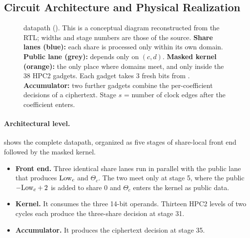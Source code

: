 \subsection{Circuit Architecture and Physical Realization}\label{sec:circuit}

\begin{figure}[t]\centering
\resizebox{\textwidth}{!}{}
\caption{\PAMS{} datapath (). This is a conceptual diagram reconstructed from the RTL; widths and stage numbers are those of the source.
\textbf{Share lanes (blue):} each share is processed only within its own domain.
\textbf{Public lane (grey):} depends only on $(c, d)$.
\textbf{Masked kernel (orange):} the only place where domains meet, and only inside the 38 HPC2 gadgets. Each gadget takes 3 fresh bits from .
\textbf{Accumulator:} two further gadgets combine the per-coefficient decisions of a ciphertext.
Stage $s$ = number of clock edges after the coefficient enters.}\label{fig:datapath}
\end{figure}

\paragraph{Architectural level.}
 shows the complete datapath, organized as five stages of share-local front end followed by the masked kernel.
\begin{itemize}
  \item \textbf{Front end.} Three identical share lanes run in parallel with the public lane that produces $\mathrm{Low}_c$ and $\Theta_c$. The two meet only at stage 5, where the public $-\mathrm{Low}_c + 2$ is added to share 0 and $\Theta_c$ enters the kernel as public data.
  \item \textbf{Kernel.} It consumes the three 14-bit operands. Thirteen HPC2 levels of two cycles each produce the three-share decision at stage 31.
  \item \textbf{Accumulator.} It produces the ciphertext decision at stage 35.
\end{itemize}

